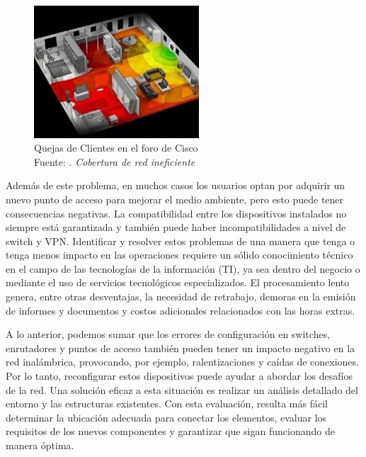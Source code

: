 \begin{figure}[h]
	\begin{center}
		\includegraphics[width=0.55\textwidth]{1/figures/CISCO_QUEJAS.jpg}
		\caption[Quejas de Clientes en el foro de Cisco]{Quejas de Clientes en el foro de Cisco\\
		Fuente: \cite{ot_cisco2022ap}. \textit{Cobertura de red ineficiente}}
		\label{1:fig2}
	\end{center}
\end{figure}

Además de este problema, en muchos casos los usuarios optan por adquirir un nuevo punto de acceso para mejorar el medio ambiente, pero esto puede tener consecuencias negativas. La compatibilidad entre los dispositivos instalados no siempre está garantizada y también puede haber incompatibilidades a nivel de switch y VPN. Identificar y resolver estos problemas de una manera que tenga o tenga menos impacto en las operaciones requiere un sólido conocimiento técnico en el campo de las tecnologías de la información (TI), ya sea dentro del negocio o mediante el uso de servicios tecnológicos especializados. El procesamiento lento genera, entre otras desventajas, la necesidad de retrabajo, demoras en la emisión de informes y documentos y costos adicionales relacionados con las horas extras.  \cite{ot_napit2017ap}

A lo anterior, podemos sumar que los errores de configuración en switches, enrutadores y puntos de acceso también pueden tener un impacto negativo en la red inalámbrica, provocando, por ejemplo, ralentizaciones y caídas de conexiones. Por lo tanto, reconfigurar estos dispositivos puede ayudar a abordar los desafíos de la red. Una solución eficaz a esta situación es realizar un análisis detallado del entorno y las estructuras existentes. Con esta evaluación, resulta más fácil determinar la ubicación adecuada para conectar los elementos, evaluar los requisitos de los nuevos componentes y garantizar que sigan funcionando de manera óptima.  \cite{ot_napit2017ap}

